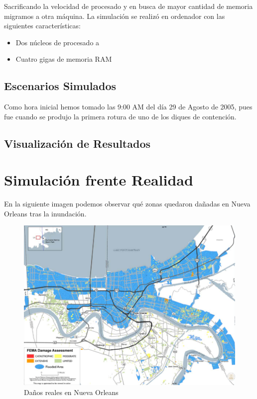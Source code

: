 Sacrificando la velocidad de procesado y en busca de mayor cantidad de memoria
migramos a otra máquina. La simulación se realizó en ordenador con las
siguientes características:

\begin{itemize}
 \item Dos núcleos de procesado a %
 \item Cuatro gigas de memoria RAM
\end{itemize}

\subsection{Escenarios Simulados}







Como hora inicial hemos tomado las 9:00 AM del día 29 de Agosto de 2005, pues
fue cuando se produjo la primera rotura de uno de los diques de
contención\cite{DeLozier}.


\subsection{Visualización de Resultados}
\section{Simulación frente Realidad}

En la siguiente imagen podemos observar qué zonas quedaron dañadas en Nueva
Orleans tras la inundación\cite{Gabe05}.

\begin{figure}[H]
 \centering
 \includegraphics[width=135mm]{figuras/cap6/NOdamage.png}
 \caption{Daños reales en Nueva Orleans}
\end{figure}

